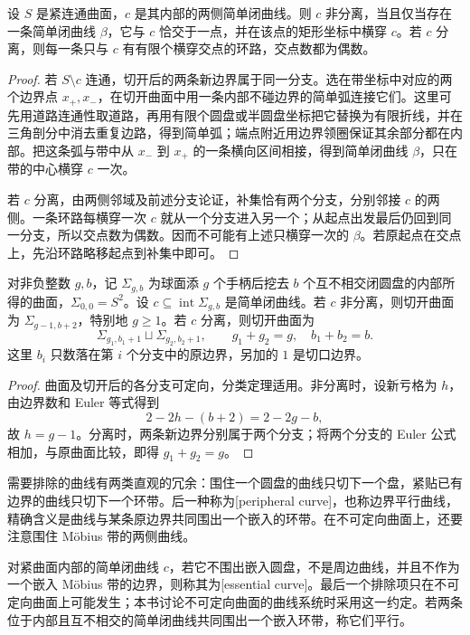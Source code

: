 \begin{proposition}\label{g1:prop:curve-separation-test}
	设 \(S\) 是紧连通曲面，\(c\) 是其内部的两侧简单闭曲线。则 \(c\) 非分离，当且仅当存在一条简单闭曲线 \(\beta\)，它与 \(c\) 恰交于一点，并在该点的矩形坐标中横穿 \(c\)。若 \(c\) 分离，则每一条只与 \(c\) 有有限个横穿交点的环路，交点数都为偶数。
\end{proposition}
\begin{proof}
	若 \(S\setminus c\) 连通，切开后的两条新边界属于同一分支。选在带坐标中对应的两个边界点 \(x_+,x_-\)，在切开曲面中用一条内部不碰边界的简单弧连接它们。这里可先用道路连通性取道路，再用有限个圆盘或半圆盘坐标把它替换为有限折线，并在三角剖分中消去重复边路，得到简单弧；端点附近用边界领圈保证其余部分都在内部。把这条弧与带中从 \(x_-\) 到 \(x_+\) 的一条横向区间相接，得到简单闭曲线 \(\beta\)，只在带的中心横穿 \(c\) 一次。

	若 \(c\) 分离，由两侧邻域及前述分支论证，补集恰有两个分支，分别邻接 \(c\) 的两侧。一条环路每横穿一次 \(c\) 就从一个分支进入另一个；从起点出发最后仍回到同一分支，所以交点数为偶数。因而不可能有上述只横穿一次的 \(\beta\)。若原起点在交点上，先沿环路略移起点到补集中即可。
\end{proof}

\begin{corollary}\label{g1:cor:orientable-cut-types}
	对非负整数 \(g,b\)，记 \(\Sigma_{g,b}\) 为球面添 \(g\) 个手柄后挖去 \(b\) 个互不相交闭圆盘的内部所得的曲面，\(\Sigma_{0,0}=S^2\)。设 \(c\subseteq\operatorname{int}\Sigma_{g,b}\) 是简单闭曲线。若 \(c\) 非分离，则切开曲面为 \(\Sigma_{g-1,b+2}\)，特别地 \(g\ge1\)。若 \(c\) 分离，则切开曲面为
	\[
		\Sigma_{g_1,b_1+1}\sqcup\Sigma_{g_2,b_2+1},
		\qquad g_1+g_2=g,\quad b_1+b_2=b.
	\]
	这里 \(b_i\) 只数落在第 \(i\) 个分支中的原边界，另加的 \(1\) 是切口边界。
\end{corollary}
\begin{proof}
	曲面及切开后的各分支可定向，分类定理适用。非分离时，设新亏格为 \(h\)，由边界数和 Euler 等式得到
	\[
		2-2h-(b+2)=2-2g-b,
	\]
	故 \(h=g-1\)。分离时，两条新边界分别属于两个分支；将两个分支的 Euler 公式相加，与原曲面比较，即得 \(g_1+g_2=g\)。
\end{proof}

需要排除的曲线有两类直观的冗余：围住一个圆盘的曲线只切下一个盘，紧贴已有边界的曲线只切下一个环带。后一种称为[peripheral curve]，也称边界平行曲线，精确含义是曲线与某条原边界共同围出一个嵌入的环带。在不可定向曲面上，还要注意围住 Möbius 带的两侧曲线。

\begin{definition}\label{g1:def:essential-surface-curve}
	对紧曲面内部的简单闭曲线 \(c\)，若它不围出嵌入圆盘，不是周边曲线，并且不作为一个嵌入 Möbius 带的边界，则称其为[essential curve]。最后一个排除项只在不可定向曲面上可能发生；本书讨论不可定向曲面的曲线系统时采用这一约定。若两条位于内部且互不相交的简单闭曲线共同围出一个嵌入环带，称它们平行。
\end{definition}

